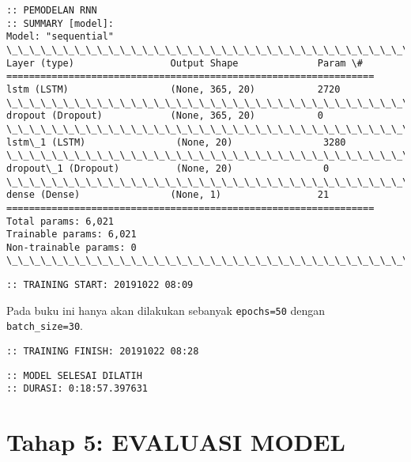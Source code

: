 \documentclass[11pt]{article}
\let\oldsection\section
\renewcommand\section{\clearpage\oldsection}
\begin{document}
    \begin{Verbatim}[commandchars=\\\{\}]
:: PEMODELAN RNN
:: SUMMARY [model]:
Model: "sequential"
\_\_\_\_\_\_\_\_\_\_\_\_\_\_\_\_\_\_\_\_\_\_\_\_\_\_\_\_\_\_\_\_\_\_\_\_\_\_\_\_\_\_\_\_\_\_\_\_\_\_\_\_\_\_\_\_\_\_\_\_\_\_\_\_\_
Layer (type)                 Output Shape              Param \#
=================================================================
lstm (LSTM)                  (None, 365, 20)           2720
\_\_\_\_\_\_\_\_\_\_\_\_\_\_\_\_\_\_\_\_\_\_\_\_\_\_\_\_\_\_\_\_\_\_\_\_\_\_\_\_\_\_\_\_\_\_\_\_\_\_\_\_\_\_\_\_\_\_\_\_\_\_\_\_\_
dropout (Dropout)            (None, 365, 20)           0
\_\_\_\_\_\_\_\_\_\_\_\_\_\_\_\_\_\_\_\_\_\_\_\_\_\_\_\_\_\_\_\_\_\_\_\_\_\_\_\_\_\_\_\_\_\_\_\_\_\_\_\_\_\_\_\_\_\_\_\_\_\_\_\_\_
lstm\_1 (LSTM)                (None, 20)                3280
\_\_\_\_\_\_\_\_\_\_\_\_\_\_\_\_\_\_\_\_\_\_\_\_\_\_\_\_\_\_\_\_\_\_\_\_\_\_\_\_\_\_\_\_\_\_\_\_\_\_\_\_\_\_\_\_\_\_\_\_\_\_\_\_\_
dropout\_1 (Dropout)          (None, 20)                0
\_\_\_\_\_\_\_\_\_\_\_\_\_\_\_\_\_\_\_\_\_\_\_\_\_\_\_\_\_\_\_\_\_\_\_\_\_\_\_\_\_\_\_\_\_\_\_\_\_\_\_\_\_\_\_\_\_\_\_\_\_\_\_\_\_
dense (Dense)                (None, 1)                 21
=================================================================
Total params: 6,021
Trainable params: 6,021
Non-trainable params: 0
\_\_\_\_\_\_\_\_\_\_\_\_\_\_\_\_\_\_\_\_\_\_\_\_\_\_\_\_\_\_\_\_\_\_\_\_\_\_\_\_\_\_\_\_\_\_\_\_\_\_\_\_\_\_\_\_\_\_\_\_\_\_\_\_\_
    \end{Verbatim}

    \begin{Verbatim}[commandchars=\\\{\}]
:: TRAINING START: 20191022 08:09
    \end{Verbatim}

    Pada buku ini hanya akan dilakukan sebanyak \texttt{epochs=50} dengan
\texttt{batch\_size=30}.

    \begin{Verbatim}[commandchars=\\\{\}]
:: TRAINING FINISH: 20191022 08:28
    \end{Verbatim}

    \begin{Verbatim}[commandchars=\\\{\}]
:: MODEL SELESAI DILATIH
:: DURASI: 0:18:57.397631
    \end{Verbatim}

    \hypertarget{tahap-5-evaluasi-model}{%
\section{Tahap 5: EVALUASI MODEL}\label{tahap-5-evaluasi-model}}
\end{document}
